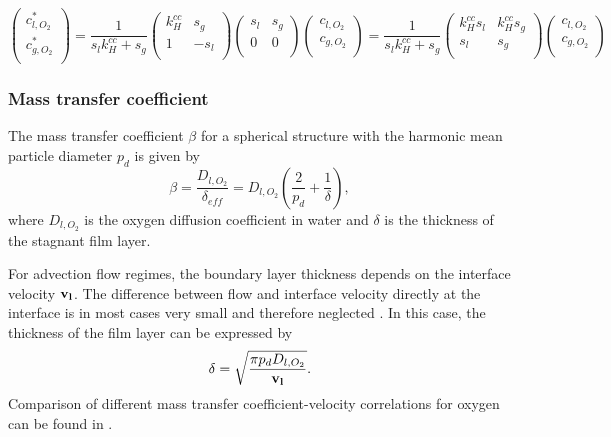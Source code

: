 \documentclass[a4paper,12pt]{article}
\newcommand{\Sl}{\mbox{$s_l\xspace$}}
\newcommand{\Sg}{\mbox{$s_g\xspace$}}
\newcommand{\coxyw}{\mbox{$c_{l,O_2}\xspace$}}
\newcommand{\rp}{\mbox{$p_d\xspace$}} %
\newcommand{\vl}{\mbox{$\bf{v}_{l}\xspace$}}
\newcommand{\coxyg}{\mbox{$c_{g,O_2}\xspace$}}
\newcommand{\coxys}{\mbox{$c^*_{l,O_2}\xspace$}}
\newcommand{\coxysg}{\mbox{$c^*_{g,O_2}\xspace$}}
\newcommand{\khcc}{\mbox{$k_{H}^{cc}\xspace$}}
\begin{document}
\begin{equation}\label{Eq:OxygenMassConservationResult}
  \begin{pmatrix}
    \coxys \\
    \coxysg \\
  \end{pmatrix}
  =
  \frac{1}{\Sl \khcc + \Sg}
  \begin{pmatrix}
    \khcc  & \Sg \\
    1 & -\Sl\\
  \end{pmatrix}
  \begin{pmatrix}
    \Sl & \Sg \\
    0 & 0\\
  \end{pmatrix}
  \begin{pmatrix}
    \coxyw \\
    \coxyg  \\
  \end{pmatrix}
  =
  \frac{1}{\Sl \khcc + \Sg}
  \begin{pmatrix}
    \khcc \Sl  & \khcc \Sg \\
    \Sl & \Sg\\
  \end{pmatrix}
  \begin{pmatrix}
    \coxyw \\
    \coxyg  \\
  \end{pmatrix}
\end{equation}


\subsubsection*{Mass transfer coefficient}
The mass transfer coefficient $\beta$ for a spherical structure with
the harmonic mean particle diameter $\rp$ is given by \cite{Clift1978}
\begin{equation} \beta =
\frac{D_{l,O_2}}{\delta_{eff}}=D_{l,O_2}\left(\frac{2}{\rp}+\frac{1}{\delta}\right),\label{Eq:masstransfercoeff}
\end{equation} where $D_{l,O_2}$ is the oxygen diffusion coefficient
in water and $\delta$ is the thickness of the stagnant film layer.

For advection flow regimes, the boundary layer thickness depends on
the interface velocity $\vl$. The difference between flow and
interface velocity directly at the interface is in most cases very
small and therefore neglected \cite{Niessner2011}. In this case, the
thickness of the film layer can be expressed by \cite{Holocher2003}
\begin{equation*} \delta=\sqrt{\frac{\pi \rp D_{l,O_2}}{\vl}}.
\end{equation*} Comparison of different mass transfer
coefficient-velocity correlations for oxygen can be found in
\cite{Geistlinger2005}.
\end{document}
